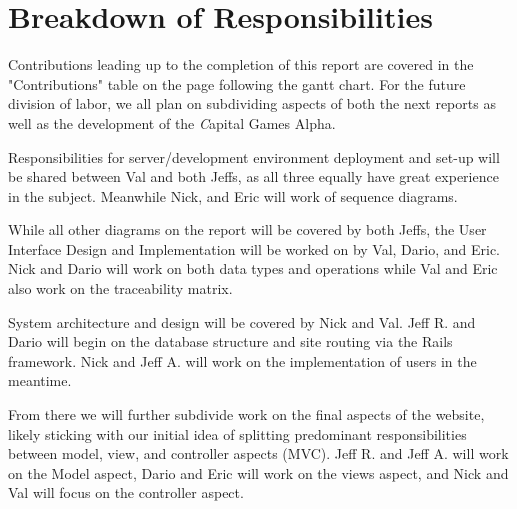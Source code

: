\section{Breakdown of Responsibilities}

Contributions leading up to the completion of this report are covered in the 
"Contributions" table on the page following the gantt chart. For the future
division of labor, we all plan on subdividing aspects of both the next reports 
as well as the development of the {\textit Capital Games} Alpha. 

Responsibilities for server/development environment deployment and set-up will be shared between Val and both Jeffs, as all three equally have great experience in the subject. Meanwhile Nick, and Eric will work of sequence diagrams.

While all other diagrams on the report will be covered by both Jeffs, the User Interface Design and Implementation will be worked on by Val, Dario, and Eric. Nick and Dario will work on both data types and operations while Val and Eric also
 work on the traceability matrix. 

System architecture and design will be covered by Nick and Val. Jeff R. and Dario will begin on the database structure and site routing via the Rails framework. Nick and Jeff A. will work on the implementation of users in the meantime.

From there we will further subdivide work on the final aspects of the website, likely sticking with our initial idea of splitting predominant responsibilities between model, view, and controller aspects (MVC). Jeff R. and Jeff A. will work on the Model aspect, Dario and Eric will work on the views aspect, and Nick and Val will focus on the controller aspect.

